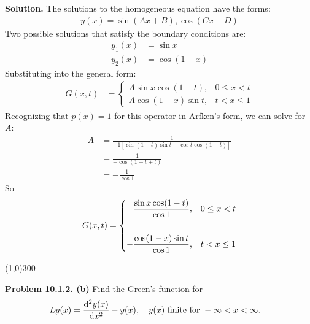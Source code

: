 \documentclass{article}
\begin{document}
\textbf{Solution.} The solutions to the homogeneous equation have the forms:
\begin{equation*}
\begin{aligned}
	y(x) = \sin (Ax + B), \cos (Cx + D)
\end{aligned}
\end{equation*}
Two possible solutions that satisfy the boundary conditions are:
\begin{equation*}
\begin{aligned}
	y_1(x) &= \sin x \\
	y_2(x) &= \cos (1-x)
\end{aligned}
\end{equation*}
Substituting into the general form:
\begin{equation*}
\begin{aligned}
	G(x,t) &=
	\begin{cases}
		A\sin x\cos (1-t), & 0\leq x<t \\
		A\cos (1-x)\sin t, & t< x\leq1
	\end{cases}
\end{aligned}
\end{equation*}
Recognizing that $p(x) = 1$ for this operator in Arfken's form, we can solve for $A$:
\begin{equation*}
\begin{aligned}
	A &= \frac{1}{+1\left[\sin (1-t)\sin t - \cos t\cos (1-t)\right]} \\
		&= \frac{1}{-\cos(1-t+t)} \\
		&= -\frac{1}{\cos 1}
\end{aligned}
\end{equation*}
So
\begin{equation*}
\begin{aligned}
	G(x,t) =
	\begin{dcases}
		-\frac{\sin x\cos (1-t)}{\cos 1}, & 0\leq x<t \\
		\phantom{.}\\
		-\frac{\cos (1-x)\sin t}{\cos 1}, & t< x\leq1
	\end{dcases}
\end{aligned}
\end{equation*}

\begin{center}
\line(1,0){300}
\end{center}
\textbf{Problem 10.1.2. (b)} Find the Green's function for
\begin{equation*}
\begin{aligned}
	Ly(x) &= \dv[2]{y(x)}{x} - y(x),\quad y(x)\text{ finite for }-\infty < x < \infty .
\end{aligned}
\end{equation*}
\end{document}
